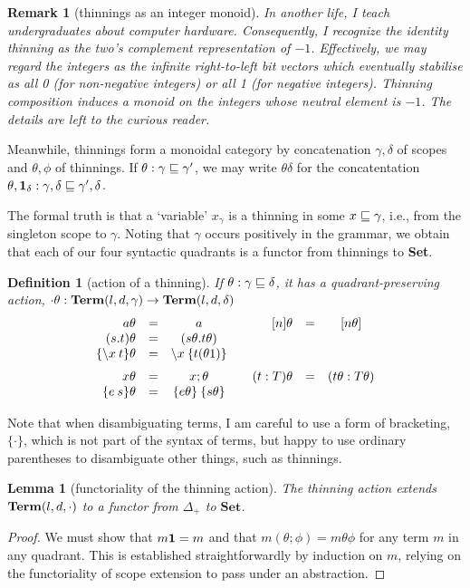 \documentclass{jfp1}
\newtheorem{lemma}[theorem]{Lemma}
\newtheorem{definition}[theorem]{Definition}
\newtheorem{remark}[theorem]{Remark}
\newcommand{\grp}[1]{\{ #1 \}}
\begin{document}
\begin{remark}[thinnings as an integer monoid]
  In another life, I teach undergraduates about computer hardware. Consequently, I recognize the identity thinning as the two's complement representation of $-1$.
  Effectively, we may regard the integers as the infinite right-to-left bit vectors which eventually stabilise as all 0 (for non-negative integers) or all 1 (for negative integers). Thinning composition induces a monoid on the integers whose neutral element is $-1$. The details are left to the curious reader.
\end{remark}

Meanwhile, thinnings form a monoidal category by concatenation
$\gamma,\delta$ of scopes and $\theta,\phi$ of thinnings.
If $\theta : \gamma\sqsubseteq\gamma'$, we may write $\theta\delta$ for
the concatentation $\theta,\mathbf{1}_\delta : \gamma,\delta \sqsubseteq \gamma',\delta$.

The formal truth is that a `variable' $x_\gamma$ is a thinning
in some $x \sqsubseteq \gamma$, i.e., from the singleton scope to $\gamma$. Noting that $\gamma$ occurs
positively in the grammar, we obtain that each of our four syntactic
quadrants is a functor from thinnings to \textbf{Set}.

\begin{definition}[action of a thinning]
  If $\theta:\gamma\sqsubseteq \delta$, it has a quadrant-preserving action, $\cdot\theta:\mathbf{Term}(l,d,\gamma)\to\mathbf{Term}(l,d,\delta)$
  \[
    \begin{array}{rlc@{\qquad}rlc}
      a\theta & = & a & [n]\theta & = & [n\theta] \\
      (s.t)\theta & = & (s\theta.t\theta) && \\
      \grp{\la x t}\theta & = & \la x \grp{t(\theta1)} && \medskip\\
      x\theta & = & x;\theta & (t:T)\theta & = & (t\theta:T\theta) \\
      \grp{e\:s}\theta & = & \grp{e\theta}\:\grp{s\theta} && \\
    \end{array}
    \]
\end{definition}

Note that when disambiguating terms, I am careful to use a form of bracketing, $\grp{\cdot}$,
which is not part of the syntax of terms, but happy to use ordinary parentheses to disambiguate
other things, such as thinnings.

\begin{lemma}[functoriality of the thinning action]
 The thinning action extends $\mathbf{Term}(l,d,\cdot)$ to a functor from $\Delta_+$ to $\textbf{Set}$.
\end{lemma}
\begin{proof}
  We must show that $m\mathbf{1} = m$ and that $m(\theta;\phi) = m\theta\phi$ for any term $m$ in any quadrant.
  This is established straightforwardly by induction on $m$, relying on the functoriality of scope extension
  to pass under an abstraction.
\end{proof}
\end{document}
